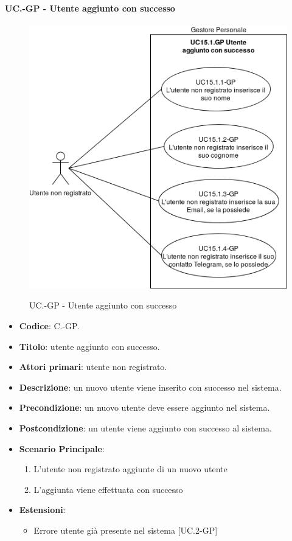 	\paragraph{UC\theuccount.\thesubuccount-GP - Utente aggiunto con successo}
		\begin{figure}[H]
			\centering
			\includegraphics[width=\columnwidth]{img/casi_d'uso/UC15_1.png}\\
			\caption{UC\theuccount.\thesubuccount-GP - Utente aggiunto con successo}
		\end{figure}
		\begin{itemize}
			\item \textbf{Codice}: C\theuccount.\thesubuccount-GP.
			\item \textbf{Titolo}: utente aggiunto con successo.
			\item \textbf{Attori primari}: utente non registrato.
			\item \textbf{Descrizione}: un nuovo utente viene inserito con successo nel sistema.
			\item \textbf{Precondizione}: un nuovo utente deve essere aggiunto nel sistema.
			\item \textbf{Postcondizione}: un utente viene aggiunto con successo al sistema.
			\item \textbf{Scenario Principale}:
			\begin{enumerate}
				\item L'utente non registrato aggiunte di un nuovo utente
				\item L'aggiunta viene effettuata con successo
			\end{enumerate}
			\item \textbf{Estensioni}:
			\begin{itemize}
				\item Errore utente già presente nel sistema [UC\theuccount.2-GP]
			\end{itemize}
		\end{itemize}
		
